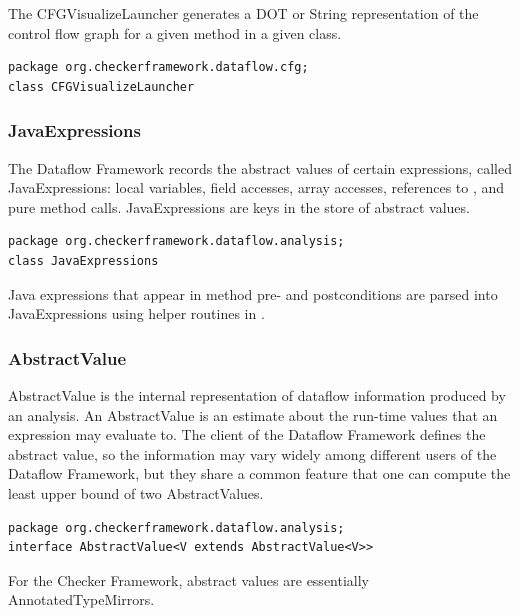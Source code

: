 \label{sec:cfg_visualize_launcher_class}

The CFGVisualizeLauncher generates a DOT or String representation of
the control flow graph for a given method in a given class.

\begin{verbatim}
package org.checkerframework.dataflow.cfg;
class CFGVisualizeLauncher
\end{verbatim}

\subsubsection{JavaExpressions}
\label{sec:flow_expressions_class}

The Dataflow Framework records the abstract values of certain
expressions, called JavaExpressions: local variables, field accesses,
array accesses, references to , and pure method calls.
JavaExpressions are keys in the store of abstract values.

\begin{verbatim}
package org.checkerframework.dataflow.analysis;
class JavaExpressions
\end{verbatim}

Java expressions that appear in method pre- and postconditions are
parsed into JavaExpressions using helper routines in
.


\subsubsection{AbstractValue}
\label{sec:abstract_value_classes}

AbstractValue is the internal representation of dataflow information
produced by an analysis.  An AbstractValue is an estimate about the
run-time values that an expression may evaluate to.  The client of the
Dataflow Framework defines the abstract value, so the information may
vary widely among different users of the Dataflow Framework, but they
share a common feature that one can compute the least upper bound of
two AbstractValues.

\begin{verbatim}
package org.checkerframework.dataflow.analysis;
interface AbstractValue<V extends AbstractValue<V>>
\end{verbatim}

For the Checker Framework, abstract values are essentially
AnnotatedTypeMirrors.

